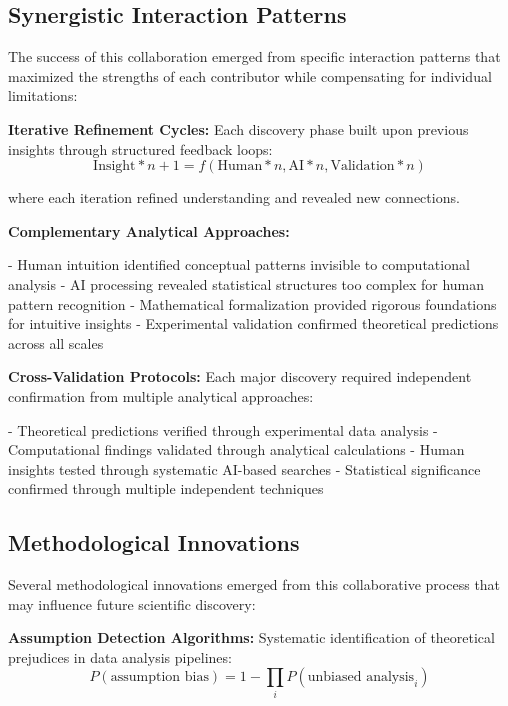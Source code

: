 \documentclass[11pt,a4paper]{article}
\begin{document}
\subsection{Synergistic Interaction Patterns}

The success of this collaboration emerged from specific interaction patterns that maximized the strengths of each contributor while compensating for individual limitations:

\textbf{Iterative Refinement Cycles:}
Each discovery phase built upon previous insights through structured feedback loops:
\begin{equation}
\text{Insight}*{n+1} = f(\text{Human}*{n}, \text{AI}*{n}, \text{Validation}*{n})
\label{eq:iterative_discovery}
\end{equation}

where each iteration refined understanding and revealed new connections.

\textbf{Complementary Analytical Approaches:}

- Human intuition identified conceptual patterns invisible to computational analysis
- AI processing revealed statistical structures too complex for human pattern recognition
- Mathematical formalization provided rigorous foundations for intuitive insights
- Experimental validation confirmed theoretical predictions across all scales

\textbf{Cross-Validation Protocols:}
Each major discovery required independent confirmation from multiple analytical approaches:

- Theoretical predictions verified through experimental data analysis
- Computational findings validated through analytical calculations
- Human insights tested through systematic AI-based searches
- Statistical significance confirmed through multiple independent techniques

\subsection{Methodological Innovations}

Several methodological innovations emerged from this collaborative process that may influence future scientific discovery:

\textbf{Assumption Detection Algorithms:}
Systematic identification of theoretical prejudices in data analysis pipelines:
\begin{equation}
P(\text{assumption bias}) = 1 - \prod_{i} P(\text{unbiased analysis}_i)
\label{eq:bias_detection}
\end{equation}
\end{document}
